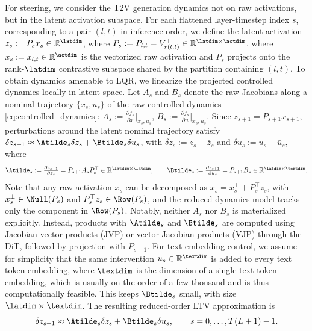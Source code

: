 \documentclass{article}
\begin{document}
For steering, we consider the T2V generation dynamics not on raw activations, but in the latent activation subspace. 
For each flattened layer-timestep index $s$, corresponding to a pair $(l,t)$ in inference order, we define the latent activation $z_s := P_s x_s \in \mathbb{R}^{\latdim}$, where $P_s := P_{l,t}=V_{r(l,t)}^\top \in \mathbb{R}^{\latdim\times\actdim}$, where $x_s:=x_{l,t}\in\mathbb{R}^{\actdim}$ is the vectorized raw activation and $P_s$ projects onto the rank-$\latdim$ contrastive subspace shared by the partition containing $(l,t)$. To obtain dynamics amenable to LQR, we linearize the projected controlled dynamics locally in latent space. Let $A_s$ and $B_s$ denote the raw Jacobians along a nominal trajectory $\{\bar x_s,\bar u_s\}$ of the raw controlled dynamics \eqref{eq:controlled_dynamics}:
    $A_s :=\frac{\partial f_s}{\partial x}
    \big|_{\bar x_s,\bar u_s}$, $B_s :=
    \frac{\partial f_s}{\partial u}
    \big|_{\bar x_s,\bar u_s}.$
Since $z_{s+1}=P_{s+1}x_{s+1}$, perturbations around the latent nominal trajectory satisfy $\delta z_{s+1}
    \approx
    \Atilde_s \delta z_s
    +
    \Btilde_s \delta u_s$, with
    $\delta z_s := z_s-\bar z_s$ and 
    $\delta u_s := u_s-\bar u_s,$ 
where
\begin{equation}\textstyle
    \Atilde_s
    :=
    \frac{\partial z_{s+1}}{\partial z_s}
    =
    P_{s+1}A_sP_s^\top
    \in \mathbb{R}^{\latdim\times\latdim},
    \qquad
    \Btilde_s
    :=
    \frac{\partial z_{s+1}}{\partial u_s}
    =
    P_{s+1}B_s
    \in \mathbb{R}^{\latdim\times\textdim}.
\end{equation}
Note that any raw activation $x_s$ can be decomposed as
    $x_s = x_s^\perp + P_s^\top z_s$, with
    $x_s^\perp \in \Null(P_s)$ and 
    $P_s^\top z_s \in \Row(P_s)$,
and the reduced dynamics model tracks only the component in $\Row(P_s)$. Notably, neither $A_s$ nor $B_s$ is materialized explicitly. Instead, products with $\Atilde_s$ and $\Btilde_s$ are computed using Jacobian-vector products (JVP) or vector-Jacobian products (VJP) through the DiT, followed by projection with $P_{s+1}$. For text-embedding control, we assume for simplicity that the same intervention $u_s\in\mathbb{R}^{\textdim}$ is added to every text token embedding, where $\textdim$ is the dimension of a single text-token embedding, which is usually on the order of a few thousand and is thus computationally feasible. This keeps $\Btilde_s$ small, with size $\latdim\times\textdim$. The resulting reduced-order LTV approximation is
\begin{equation}
\label{eq:latentdynamics}
    \delta z_{s+1}
    \approx
    \Atilde_s \delta z_s
    +
    \Btilde_s \delta u_s,
    \qquad
    s=0,\ldots,T(L+1)-1.
\end{equation}
\end{document}
